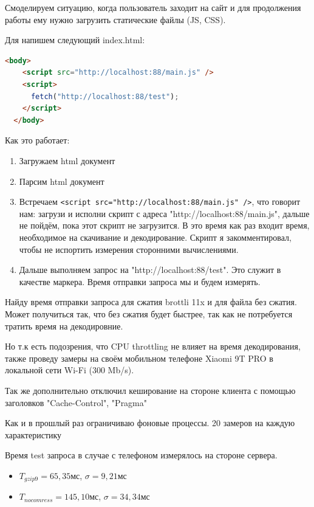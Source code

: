 \documentclass[12pt]{article}
\begin{document}
Смоделируем ситуацию, когда пользователь заходит на сайт и для продолжения работы ему нужно загрузить статические файлы (JS, CSS).

Для напишем следующий index.html:

\begin{lstlisting}[language=HTML]
  <body>
    <script src="http://localhost:88/main.js" />
    <script>
      fetch("http://localhost:88/test");
    </script>
  </body>
\end{lstlisting}

Как это работает:

\begin{enumerate}
    \item Загружаем html документ
    \item Парсим html документ
    \item Встречаем \verb|<script src="http://localhost:88/main.js" />|, что говорит нам: загрузи и исполни скрипт с адреса "http://localhost:88/main.js",
          дальше не пойдём, пока этот скрипт не загрузится. В это время как раз входит время, необходимое на скачивание и декодирование.
          Скрипт я закомментировал, чтобы не испортить измерения сторонними вычислениями.
    \item Дальше выполняем запрос на "http://localhost:88/test". Это служит в качестве маркера. Время отправки запроса мы и будем измерять.
\end{enumerate}

Найду время отправки запроса для сжатия brottli 11x и для файла без сжатия. Может получиться так, что без сжатия будет быстрее,
так как не потребуется тратить время на декодировние.

Но т.к есть подозрения, что CPU throttling не влияет на время декодирования, также проведу замеры на своём мобильном телефоне Xiaomi 9T PRO в локальной сети Wi-Fi (300 Mb/s).

Так же дополнительно отключил кеширование на стороне клиента с помощью заголовков "Cache-Control", "Pragma"

Как и в прошлый раз ограничиваю фоновые процессы. 20 замеров на каждую характеристику

Время test запроса в случае с телефоном измерялось на стороне сервера.

\begin{itemize}
    \item $T_{gzip9}=65,35$мс, $\sigma = 9,21$мс
    \item $T_{no comress}=145,10$мс, $\sigma = 34,34$мс
\end{itemize}
\end{document}
